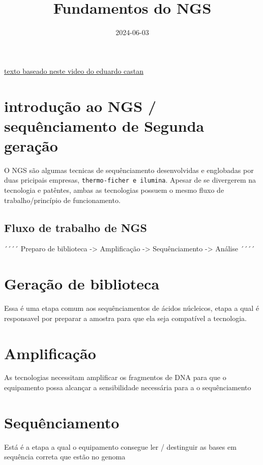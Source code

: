 \documentclass[
  letterpaper,
  DIV=11,
  numbers=noendperiod]{scrartcl}
\title{Fundamentos do NGS}
\author{}
\date{2024-06-03}
\begin{document}
\maketitle

\href{https://www.youtube.com/watch?v=uKCCIAhLFrU}{texto baseado neste
video do eduardo castan}

\section{introdução ao NGS / sequênciamento de Segunda
geração}\label{introduuxe7uxe3o-ao-ngs-sequuxeanciamento-de-segunda-gerauxe7uxe3o}

O NGS são algumas tecnicas de sequênciamento desenvolvidas e englobadas
por duas pricipais empresas, \texttt{thermo-ficher\ e\ ilumina}. Apesar
de se divergerem na tecnologia e patêntes, ambas as tecnologias possuem
o mesmo fluxo de trabalho/princípio de funcionamento.

\subsection{Fluxo de trabalho de NGS}\label{fluxo-de-trabalho-de-ngs}

´´´´ Preparo de biblioteca -\textgreater{} Amplificação -\textgreater{}
Sequênciamento -\textgreater{} Análise ´´´´

\section{Geração de biblioteca}\label{gerauxe7uxe3o-de-biblioteca}

Essa é uma etapa comum aos sequênciamentos de ácidos núcleicos, etapa a
qual é responsavel por preparar a amostra para que ela seja compatível a
tecnologia.

\section{Amplificação}\label{amplificauxe7uxe3o}

As tecnologias necessitam amplificar os fragmentos de DNA para que o
equipamento possa alcançar a sensibilidade necessária para a o
sequênciamento

\section{Sequênciamento}\label{sequuxeanciamento}

Está é a etapa a qual o equipamento consegue ler / destinguir as bases
em sequência correta que estão no genoma
\end{document}
